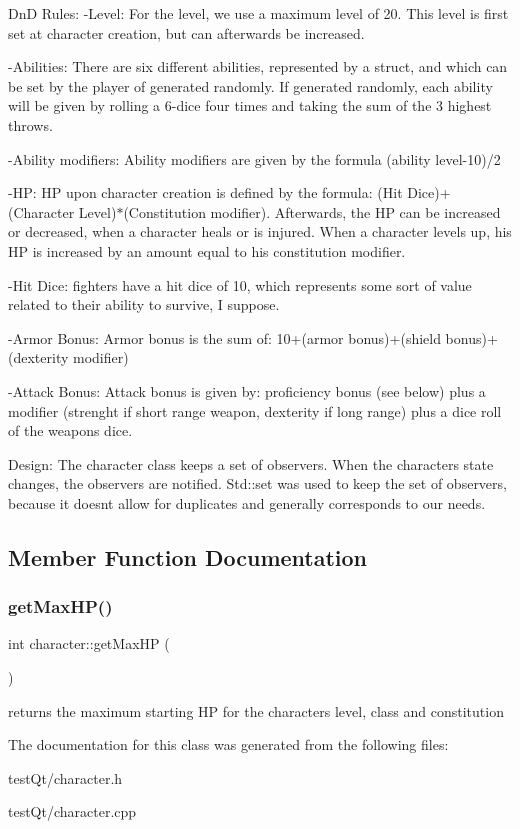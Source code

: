 DnD Rules\+: -\/\+Level\+: For the level, we use a maximum level of 20. This level is first set at character creation, but can afterwards be increased.

-\/\+Abilities\+: There are six different abilities, represented by a struct, and which can be set by the player of generated randomly. If generated randomly, each ability will be given by rolling a 6-\/dice four times and taking the sum of the 3 highest throws.

-\/\+Ability modifiers\+: Ability modifiers are given by the formula (ability level-\/10)/2

-\/\+HP\+: HP upon character creation is defined by the formula\+: (Hit Dice)+(Character Level)$\ast$(Constitution modifier). Afterwards, the HP can be increased or decreased, when a character heals or is injured. When a character levels up, his HP is increased by an amount equal to his constitution modifier.

-\/\+Hit Dice\+: fighters have a hit dice of 10, which represents some sort of value related to their ability to survive, I suppose.

-\/\+Armor Bonus\+: Armor bonus is the sum of\+: 10+(armor bonus)+(shield bonus)+(dexterity modifier)

-\/\+Attack Bonus\+: Attack bonus is given by\+: proficiency bonus (see below) plus a modifier (strenght if short range weapon, dexterity if long range) plus a dice roll of the weapon\textquotesingle{}s dice.

Design\+: The character class keeps a set of observers. When the character\textquotesingle{}s state changes, the observers are notified. Std\+::set was used to keep the set of observers, because it doesn\textquotesingle{}t allow for duplicates and generally corresponds to our needs. 

\subsection{Member Function Documentation}
\hypertarget{classcharacter_a7545a786510f968f6299e8975e6b6b06}{}\label{classcharacter_a7545a786510f968f6299e8975e6b6b06} 
\subsubsection{\texorpdfstring{get\+Max\+H\+P()}{getMaxHP()}}
{\footnotesize\ttfamily int character\+::get\+Max\+HP (\begin{DoxyParamCaption}{ }\end{DoxyParamCaption})}

returns the maximum starting HP for the character\textquotesingle{}s level, class and constitution 

The documentation for this class was generated from the following files\+:\begin{DoxyCompactItemize}
\item 
test\+Qt/character.\+h\item 
test\+Qt/character.\+cpp\end{DoxyCompactItemize}
